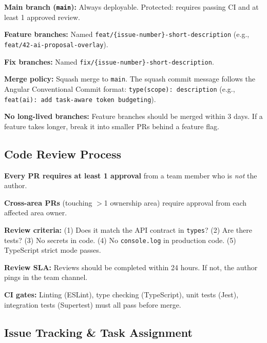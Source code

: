 \documentclass[10pt, a4paper]{article}
\begin{document}
\begin{speclist}
\item \textbf{Main branch (\texttt{main}):} Always deployable. Protected: requires passing CI and at least 1 approved review.
\item \textbf{Feature branches:} Named \texttt{feat/\{issue-number\}-short-description} (e.g., \texttt{feat/42-ai-proposal-overlay}).
\item \textbf{Fix branches:} Named \texttt{fix/\{issue-number\}-short-description}.
\item \textbf{Merge policy:} Squash merge to \texttt{main}. The squash commit message follows the Angular Conventional Commit format: \texttt{type(scope): description} (e.g., \texttt{feat(ai): add task-aware token budgeting}).
\item \textbf{No long-lived branches:} Feature branches should be merged within 3 days. If a feature takes longer, break it into smaller PRs behind a feature flag.
\end{speclist}

\subsection{Code Review Process}

\begin{speclist}
\item \textbf{Every PR requires at least 1 approval} from a team member who is \emph{not} the author.
\item \textbf{Cross-area PRs} (touching $>$1 ownership area) require approval from each affected area owner.
\item \textbf{Review criteria:} (1) Does it match the API contract in \texttt{types}? (2) Are there tests? (3) No secrets in code. (4) No \texttt{console.log} in production code. (5) TypeScript strict mode passes.
\item \textbf{Review SLA:} Reviews should be completed within 24 hours. If not, the author pings in the team channel.
\item \textbf{CI gates:} Linting (ESLint), type checking (TypeScript), unit tests (Jest), integration tests (Supertest) must all pass before merge.
\end{speclist}

\subsection{Issue Tracking \& Task Assignment}
\end{document}

